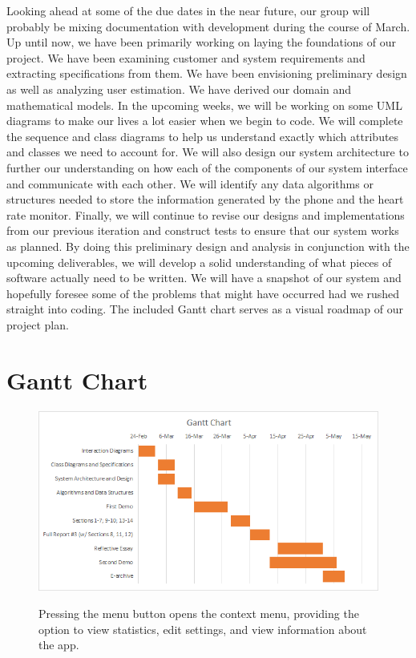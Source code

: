 \documentclass[letterpaper,english, 12pt]{scrreprt}
\begin{document}
Looking ahead at some of the due dates in the near future, our group will probably be mixing documentation with development during the course of March. Up until now, we have been primarily working on laying the foundations of our project. We have been examining customer and system requirements and extracting specifications from them. We have been envisioning preliminary design as well as analyzing user estimation. We have derived our domain and mathematical models. 
In the upcoming weeks, we will be working on some UML diagrams to make our lives a lot easier when we begin to code. We will complete the sequence and class diagrams to help us understand exactly which attributes and classes we need to account for. We will also design our system architecture to further our understanding on how each of the components of our system interface and communicate with each other. We will identify any data algorithms or structures needed to store the information generated by the phone and the heart rate monitor. Finally, we will continue to revise our designs and implementations from our previous iteration and construct tests to ensure that our system works as planned.
By doing this preliminary design and analysis in conjunction with the upcoming deliverables, we will develop a solid understanding of what pieces of software actually need to be written. We will have a snapshot of our system and hopefully foresee some of the problems that might have occurred had we rushed straight into coding.
The included Gantt chart serves as a visual roadmap of our project plan.

\section{Gantt Chart}


\begin{figure}[H]
	\centering
	\includegraphics{img/Gantt_Chart.png}\\
	\caption{Pressing the menu button opens the context menu, providing the option to view statistics, edit settings, and view information about the app.}
\end{figure}
\end{document}
